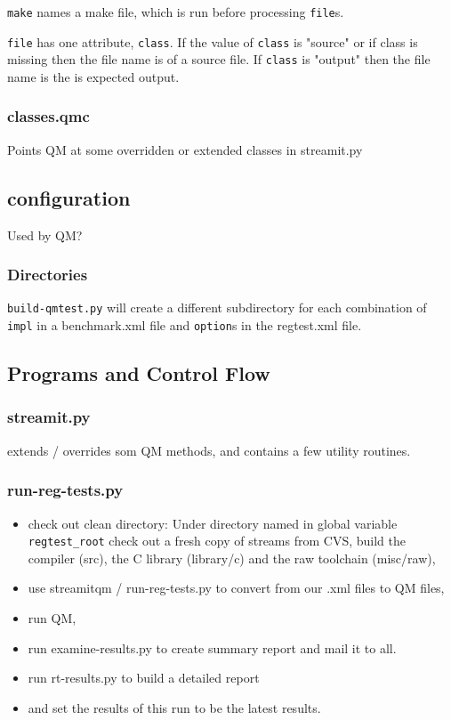 \documentclass[11pt]{article}
\begin{document}
{\tt make} names a make file, which is run before processing {\tt file}s.

{\tt file} has one attribute, {\tt class}.  If the value of {\tt class}
is "source" or if class is missing then the file name is of a source
file.  If {\tt class} is "output" then the file name is the is expected
output.

\subsubsection{classes.qmc}
Points QM at some overridden or extended classes in streamit.py

\subsection{configuration}
Used by QM?

\subsubsection{Directories}
{\tt build-qmtest.py} will create a different subdirectory for each
combination of {\tt impl} in a benchmark.xml file and {\tt option}s in
the regtest.xml file.


\subsection{Programs and Control Flow}

\subsubsection{streamit.py}
extends / overrides som QM methods, and contains a few utility routines.

\subsubsection{run-reg-tests.py}
\begin{itemize}
\item check out clean directory:
 Under directory named in global variable {\tt regtest\_root} check
 out a fresh copy of streams from CVS, build the compiler (src), the C
 library (library/c) and the raw toolchain (misc/raw),
\item use streamitqm / run-reg-tests.py to convert from our .xml files to QM
  files,
\item run QM,
\item run examine-results.py to create summary report and mail it to all.
\item run rt-results.py to build a detailed report
\item and set the results of this run to be the latest results.
\end{itemize}
\end{document}
